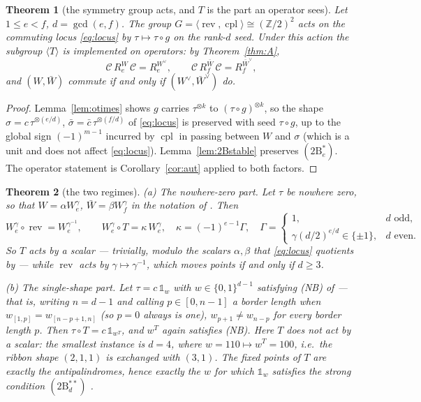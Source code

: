 \documentclass[11pt]{article}
\newtheorem{theorem}{Theorem}[section]
\theoremstyle{definition}
\theoremstyle{remark}
\newcommand{\Z}{\mathbb{Z}}
\newcommand{\Cop}{\mathcal{C}}
\newcommand{\rev}{\operatorname{rev}}
\newcommand{\cpl}{\operatorname{cpl}}
\begin{document}
\begin{theorem}[the symmetry group acts, and $T$ is the part an operator sees]\label{thm:C}
Let $1\le e<f$, $d=\gcd(e,f)$.  The group $G=\langle\rev,\cpl\rangle\cong(\Z/2)^2$ acts on the
commuting locus \eqref{eq:locus} by $\tau\mapsto\tau\circ g$ on the rank-$d$ seed.  Under this
action the subgroup $\langle T\rangle$ is implemented on operators: by Theorem~\ref{thm:A},
\[
   \Cop\,R_e^{W}\,\Cop=R_e^{W^{\vee}},\qquad \Cop\,R_f^{\bar W}\,\Cop=R_f^{\bar W^{\vee}},
\]
and $(W,\bar W)$ commute if and only if $(W^{\vee},\bar W^{\vee})$ do.
\end{theorem}

\begin{proof}
Lemma~\ref{lem:otimes} shows $g$ carries $\tau^{\otimes k}$ to $(\tau\circ g)^{\otimes k}$, so
the shape $\sigma=c\,\tau^{\otimes(e/d)}$, $\bar\sigma=\bar c\,\tau^{\otimes(f/d)}$ of
\eqref{eq:locus} is preserved with seed $\tau\circ g$, up to the global sign $(-1)^{m-1}$
incurred by $\cpl$ in passing between $W$ and $\sigma$ (which is a unit and does not affect
\eqref{eq:locus}).  Lemma~\ref{lem:2Bstable} preserves $(2\mathrm B^{*}_e)$.  The operator
statement is Corollary~\ref{cor:aut} applied to both factors.
\end{proof}

\begin{theorem}[the two regimes]\label{thm:D}
\emph{(a) The nowhere-zero part.}  Let $\tau$ be nowhere zero, so that
$W=\alpha W^{\gamma}_e$, $\bar W=\beta W^{\gamma}_f$ in the notation of
\cite[Conv.~\texttt{conv:gamma}]{Q149}.  Then
\[
  W^{\gamma}_e\circ\rev=W^{\gamma^{-1}}_e,\qquad
  W^{\gamma}_e\circ T=\kappa\,W^{\gamma}_e,\quad
  \kappa=(-1)^{e-1}\Gamma,\quad
  \Gamma=\begin{cases}1,& d \text{ odd},\\ \gamma(d/2)^{e/d}\in\{\pm1\},& d\text{ even}.
  \end{cases}
\]
So $T$ acts by a \emph{scalar} --- trivially, modulo the scalars $\alpha,\beta$ that
\eqref{eq:locus} quotients by --- while $\rev$ acts by $\gamma\mapsto\gamma^{-1}$, which moves
points if and only if $d\ge3$.

\emph{(b) The single-shape part.}  Let $\tau=c\,\mathbb 1_w$ with $w\in\{0,1\}^{d-1}$
satisfying \textnormal{(NB)} of \cite[Def.~\texttt{def:border}]{Q150c2} --- that is, writing
$n=d-1$ and calling $p\in[0,n-1]$ a \emph{border length} when $w_{[1,p]}=w_{[n-p+1,n]}$
(so $p=0$ always is one), $w_{p+1}\ne w_{n-p}$ for every border length $p$.  Then
$\tau\circ T=c\,\mathbb 1_{w^{T}}$, and $w^{T}$ again satisfies \textnormal{(NB)}.  Here $T$
does \emph{not} act by a scalar: the smallest instance is $d=4$, where
$w=110\mapsto w^{T}=100$, i.e.\ the ribbon shape $(2,1,1)$ is exchanged with $(3,1)$.  The
fixed points of $T$ are exactly the \emph{antipalindromes}, hence exactly the $w$ for which
$\mathbb 1_w$ satisfies the strong condition
$(2\mathrm B^{**}_d)$ \cite[Thm.~\texttt{thm:singleton2}]{Q150c2}.
\end{theorem}
\end{document}
